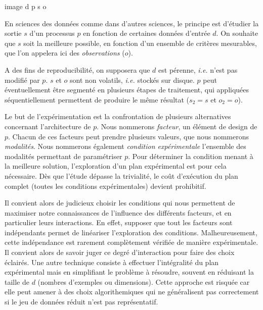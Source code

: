 image d p s
        o

En sciences des données comme dans d'autres sciences, le principe est d'étudier la sortie $s$ d'un processus $p$ en fonction de certaines données d'entrée $d$. On souhaite que $s$ soit la meilleure possible, en fonction d'un ensemble de critères mesurables, que l'on appelera ici des \textsl{observations} ($o$).

A des fins de reproducibilité, on supposera que $d$ est pérenne, \textit{i.e.} n'est pas modifié par $p$. $s$ et $o$ sont non volatils, \textit{i.e.} stockés sur disque. $p$ peut éventuellement être segmenté en plusieurs étapes de traitement, qui appliquées séquentiellement permettent de produire le même résultat ($s_2=s$ et $o_2=o$).



Le but de l'expérimentation est la confrontation de plusieurs alternatives concernant l'architecture de $p$. Nous nommerons \textsl{facteur}, un élément de design de $p$. Chacun de ces facteurs peut prendre plusieurs valeurs, que nous nommerons \textsl{modalités}. Nous nommerons également \textsl{condition expérimentale} l'ensemble des modalités permettant de paramétriser $p$. Pour déterminer la condition menant à la meilleure solution, l'exploration d'un plan expérimental est pour cela nécessaire. Dès que l'étude dépasse la trivialité, le coût d'exécution du plan complet (toutes les conditions expérimentales) devient prohibitif.

Il convient alors de judicieux choisir les conditions qui nous permettent de maximiser notre connaissances de l'influence des différents facteurs, et en particulier leurs interactions. En effet, supposer que tout les facteurs sont indépendants permet de linéariser l'exploration des conditions. Malheureusement, cette indépendance est rarement complètement vérifiée de manière expérimentale. Il convient alors de savoir juger ce degré d'interaction pour faire des choix éclairés. Une autre technique consiste à effectuer l'intégralité du plan expérimental mais en simplifiant le problème à résoudre, souvent en réduisant la taille de $d$ (nombres d'exemples ou dimensions). Cette approche est risquée car elle peut amener à des choix algorithemiques qui ne généralisent pas correctement si le jeu de données réduit n'est pas représentatif.

